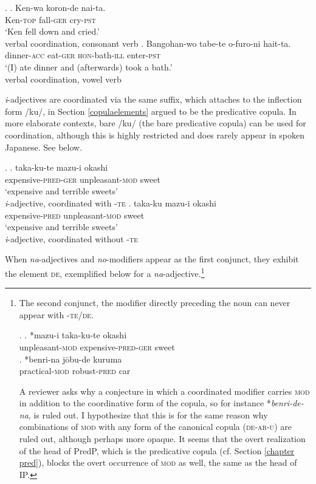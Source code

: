 \ex. \ag. Ken-wa koron-de nai-ta.\\
Ken-\textsc{top} fall-\textsc{ger} cry-\textsc{pst}\\
`Ken fell down and cried.’ \\ \null \hfill verbal coordination, consonant verb \citep[357]{hiraiwa:2012:mechanism} \label{koronde}
\bg. Bangohan-wo tabe-te o-furo-ni hait-ta.\\
dinner-\textsc{acc} eat-\textsc{ger} \textsc{hon}-bath-\textsc{ill} enter-\textsc{pst}\\
`(I) ate dinner and (afterwards) took a bath.' \\ \null \hfill verbal coordination, vowel verb \label{tabete}

\textit{i}-adjectives are coordinated via the same suffix, which attaches to the inflection form /ku/, in Section \ref{copulaelements} argued to be the predicative copula. In more elaborate contexts, bare /ku/ (the bare predicative copula) can be used for coordination, although this is highly restricted and does rarely appear in spoken Japanese. See below. 

\ex. \ag. taka-ku-te mazu-i okashi\\
expensive-\textsc{pred-ger} unpleasant-\textsc{mod} sweet\\
`expensive and terrible sweets' \\ \null \hfill \textit{i}-adjective, coordinated with -\textsc{te}
\bg. taka-ku mazu-i okashi\\
expensive-\textsc{pred} unpleasant-\textsc{mod} sweet\\
`expensive and terrible sweets' \\ \null \hfill \textit{i}-adjective, coordinated without -\textsc{te}

When \textit{na}-adjectives and \textit{no}-modifiers appear as the first conjunct, they exhibit the element \textsc{de}, exemplified below for a \textit{na}-adjective.\footnote{The second conjunct, the modifier directly preceding the noun can never appear with -\textsc{te/de}.

\par

\ex. \ag. *mazu-i taka-ku-te okashi\\
unpleasant-\textsc{mod} expensive-\textsc{pred-ger} sweet\\
\bg. *benri-na jōbu-de kuruma\\
practical-\textsc{mod} robust-\textsc{pred} car\\

\par


A reviewer asks why a conjecture in which a coordinated modifier carries \textsc{mod} in addition to the coordinative form of the copula, so for instance *\textit{benri-de-na}, is ruled out. I hypothesize that this is for the same reason why combinations of \textsc{mod} with any form of the canonical copula (\textsc{de-ar-u}) are ruled out, although perhaps more opaque. It seems that the overt realization of the head of PredP, which is the predicative copula (cf. Section \ref{chapter pred}), blocks the overt occurrence of \textsc{mod} as well, the same as the head of IP.}

